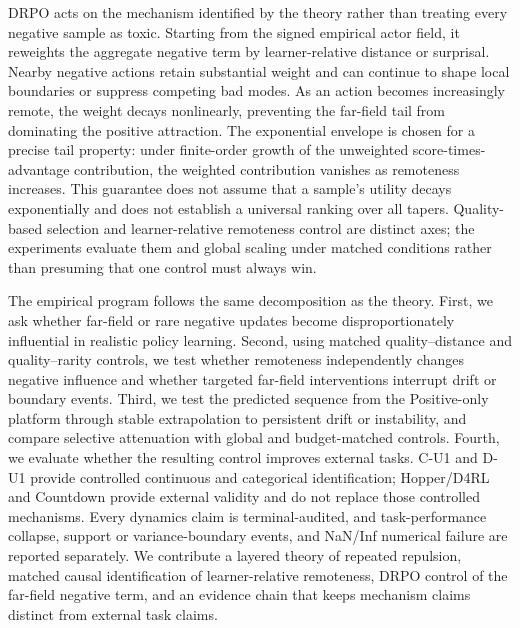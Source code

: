 DRPO acts on the mechanism identified by the theory rather than treating every negative sample as toxic. Starting from the signed empirical actor field, it reweights the aggregate negative term by learner-relative distance or surprisal. Nearby negative actions retain substantial weight and can continue to shape local boundaries or suppress competing bad modes. As an action becomes increasingly remote, the weight decays nonlinearly, preventing the far-field tail from dominating the positive attraction. The exponential envelope is chosen for a precise tail property: under finite-order growth of the unweighted score-times-advantage contribution, the weighted contribution vanishes as remoteness increases. This guarantee does not assume that a sample's utility decays exponentially and does not establish a universal ranking over all tapers. Quality-based selection and learner-relative remoteness control are distinct axes; the experiments evaluate them and global scaling under matched conditions rather than presuming that one control must always win.

The empirical program follows the same decomposition as the theory. First, we ask whether far-field or rare negative updates become disproportionately influential in realistic policy learning. Second, using matched quality--distance and quality--rarity controls, we test whether remoteness independently changes negative influence and whether targeted far-field interventions interrupt drift or boundary events. Third, we test the predicted sequence from the Positive-only platform through stable extrapolation to persistent drift or instability, and compare selective attenuation with global and budget-matched controls. Fourth, we evaluate whether the resulting control improves external tasks. C-U1 and D-U1 provide controlled continuous and categorical identification; Hopper/D4RL and Countdown provide external validity and do not replace those controlled mechanisms. Every dynamics claim is terminal-audited, and task-performance collapse, support or variance-boundary events, and NaN/Inf numerical failure are reported separately. We contribute a layered theory of repeated repulsion, matched causal identification of learner-relative remoteness, DRPO control of the far-field negative term, and an evidence chain that keeps mechanism claims distinct from external task claims.
